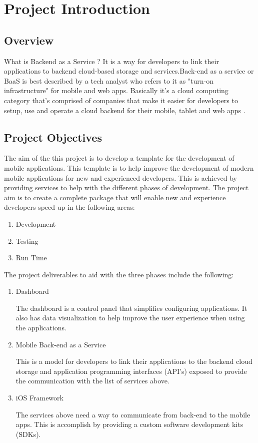 \chapter{Project Introduction}

\section{Overview}

What is Backend as a Service ? It is a way for developers to link their applications to backend cloud-based storage and services.Back-end as a service or BaaS is best described by a tech analyst who refers to it as "turn-on infrastructure" for mobile and web apps. Basically it's a cloud computing category that's comprised of companies that make it easier for developers to setup, use and operate a cloud backend for their mobile, tablet and web apps \cite{kinveywebsite}.  

\section{Project Objectives}
The aim of the this project is to develop a template for the development of mobile applications. This template is to help improve the development of modern mobile applications for new and experienced developers. This is achieved by providing services to help with the different phases of development. The project aim is to create a complete package that will enable new and experience developers speed up in the following areas:

\begin{enumerate}
  \item Development
  \item Testing 
  \item Run Time
\end{enumerate}

The project deliverables to aid with the three phases include the following:

\begin{enumerate}
  \item Dashboard
  
    The dashboard is a control panel that simplifies configuring applications. It also has data visualization to help improve the user experience when using the applications.
  \item Mobile Back-end as a Service
  
    This is a model for developers to link their applications to the backend cloud storage and application programming interfaces (API's) exposed to provide the communication with the list of services above.
  \item iOS Framework
  
    The services above need a way to communicate from back-end to the mobile apps. This is accomplish by providing a custom software development kits (SDKs).
\end{enumerate}

